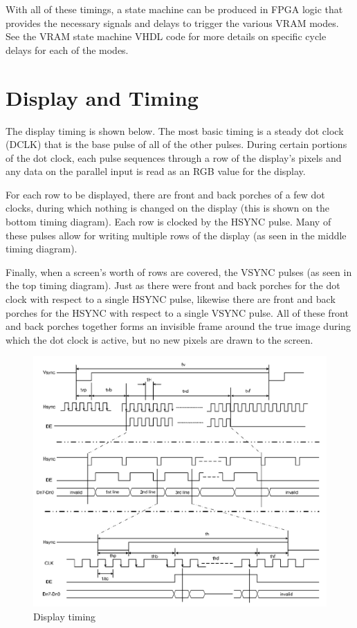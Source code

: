 With all of these timings, a state machine can be produced in FPGA logic that provides the necessary signals and delays to trigger the various VRAM modes. See the VRAM state machine VHDL code for more details on specific cycle delays for each of the modes.

\section{Display and Timing}

The display timing is shown below. The most basic timing is a steady dot clock (DCLK) that is the base pulse of all of the other pulses. During certain portions of the dot clock, each pulse sequences through a row of the display's pixels and any data on the parallel input is read as an RGB value for the display.

For each row to be displayed, there are front and back porches of a few dot clocks, during which nothing is changed on the display (this is shown on the bottom timing diagram). Each row is clocked by the HSYNC pulse. Many of these pulses allow for writing multiple rows of the display (as seen in the middle timing diagram).

Finally, when a screen's worth of rows are covered, the VSYNC pulses (as seen in the top timing diagram). Just as there were front and back porches for the dot clock with respect to a single HSYNC pulse, likewise there are front and back porches for the HSYNC with respect to a single VSYNC pulse. All of these front and back porches together forms an invisible frame around the true image during which the dot clock is active, but no new pixels are drawn to the screen.

\begin{figure}[ht!]
    \centering
    \includegraphics[width=6in]{Timing/disp_timing.png}
		\caption{Display timing}
\end{figure}

